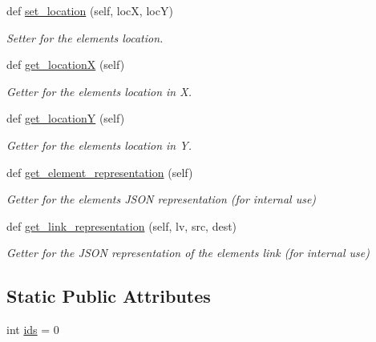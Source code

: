 \begin{DoxyCompactItemize}
def \mbox{\hyperlink{classbridges_1_1element_1_1_element_aa1387621f7afa6b6f6acd052a1126320}{set\+\_\+location}} (self, locX, locY)
\begin{DoxyCompactList}\small\item\em Setter for the element\textquotesingle{}s location. \end{DoxyCompactList}\item 
def \mbox{\hyperlink{classbridges_1_1element_1_1_element_aa921953dab3cec5253e813bb1709895a}{get\+\_\+locationX}} (self)
\begin{DoxyCompactList}\small\item\em Getter for the element\textquotesingle{}s location in X. \end{DoxyCompactList}\item 
def \mbox{\hyperlink{classbridges_1_1element_1_1_element_a108f62843d084beaf5fcf5fd202853c5}{get\+\_\+locationY}} (self)
\begin{DoxyCompactList}\small\item\em Getter for the element\textquotesingle{}s location in Y. \end{DoxyCompactList}\item 
def \mbox{\hyperlink{classbridges_1_1element_1_1_element_a511fbc6323616d806ae0ae33010f4654}{get\+\_\+element\+\_\+representation}} (self)
\begin{DoxyCompactList}\small\item\em Getter for the element\textquotesingle{}s J\+S\+ON representation (for internal use) \end{DoxyCompactList}\item 
def \mbox{\hyperlink{classbridges_1_1element_1_1_element_a8f220d7b81c0e0dd84b9eff33ade76b9}{get\+\_\+link\+\_\+representation}} (self, lv, src, dest)
\begin{DoxyCompactList}\small\item\em Getter for the J\+S\+ON representation of the element\textquotesingle{}s link (for internal use) \end{DoxyCompactList}\end{DoxyCompactItemize}
\subsection*{Static Public Attributes}
\begin{DoxyCompactItemize}
\item 
int \mbox{\hyperlink{classbridges_1_1element_1_1_element_a61f02c915a65554b76dd6534e5a4d834}{ids}} = 0
\end{DoxyCompactItemize}


